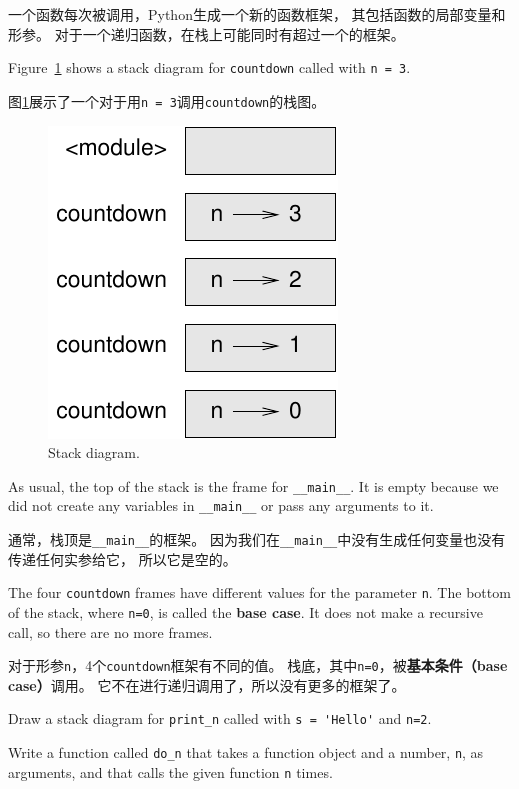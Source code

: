 \documentclass[10pt]{book}
\begin{document}
\begin{CJK}{UTF8}{gbsn}
一个函数每次被调用，Python生成一个新的函数框架，
其包括函数的局部变量和形参。
对于一个递归函数，在栈上可能同时有超过一个的框架。

Figure~\ref{fig.stack2} shows a stack diagram for {\tt countdown} called with
{\tt n = 3}.

图\ref{fig.stack2}展示了一个对于用{\tt n = 3}调用{\tt countdown}的栈图。

\begin{figure}
\centerline
{\includegraphics[scale=0.8]{figs/stack2.pdf}}
\caption{Stack diagram.}
\label{fig.stack2}
\end{figure}


As usual, the top of the stack is the frame for \verb"__main__".
It is empty because we did not create any variables in 
\verb"__main__" or pass any arguments to it.

通常，栈顶是\verb"__main__"的框架。
因为我们在\verb"__main__"中没有生成任何变量也没有传递任何实参给它，
所以它是空的。

The four {\tt countdown} frames have different values for the
parameter {\tt n}.  The bottom of the stack, where {\tt n=0}, is
called the {\bf base case}.  It does not make a recursive call, so
there are no more frames.

对于形参{\tt n}，4个{\tt countdown}框架有不同的值。
栈底，其中{\tt n=0}，被{\bf 基本条件（base case）}调用。
它不在进行递归调用了，所以没有更多的框架了。

\begin{exercise}
Draw a stack diagram for \verb"print_n" called with
\verb"s = 'Hello'" and {\tt n=2}.
\end{exercise}

\begin{exercise}
Write a function called \verb"do_n" that takes a function
object and a number, {\tt n}, as arguments, and that calls
the given function {\tt n} times.
\end{exercise}




\end{CJK}
\end{document}
